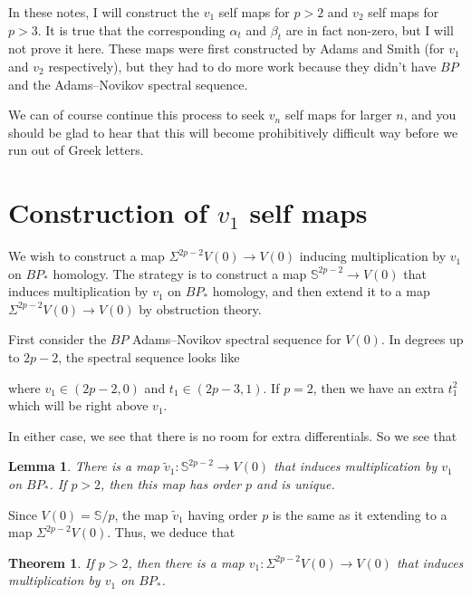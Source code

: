 \documentclass{shortart}
\newtheorem*{thm}{Theorem}
\newtheorem*{lemma}{Lemma}
\theoremstyle{definition}
\newcommand\Sph{\mathbb{S}}
\begin{document}
In these notes, I will construct the $v_1$ self maps for $p > 2$ and $v_2$ self maps for $p > 3$. It is true that the corresponding $\alpha_t$ and $\beta_t$ are in fact non-zero, but I will not prove it here. These maps were first constructed by Adams and Smith (for $v_1$ and $v_2$ respectively), but they had to do more work because they didn't have $BP$ and the Adams--Novikov spectral sequence.

We can of course continue this process to seek $v_n$ self maps for larger $n$, and you should be glad to hear that this will become prohibitively difficult way before we run out of Greek letters.
\section{Construction of \texorpdfstring{$v_1$}{v1} self maps}
We wish to construct a map $\Sigma^{2p - 2} V(0) \to V(0)$ inducing multiplication by $v_1$ on $BP_*$ homology. The strategy is to construct a map $\Sph^{2p - 2} \to V(0)$ that induces multiplication by $v_1$ on $BP_*$ homology, and then extend it to a map $\Sigma^{2p - 2}V(0) \to V(0)$ by obstruction theory.

First consider the $BP$ Adams--Novikov spectral sequence for $V(0)$. In degrees up to $2p - 2$, the spectral sequence looks like
\begin{center}
\end{center}
where $v_1 \in (2p - 2, 0)$ and $t_1 \in (2p - 3, 1)$. If $p = 2$, then we have an extra $t_1^2$ which will be right above $v_1$.

In either case, we see that there is no room for extra differentials. So we see that
\begin{lemma}
  There is a map $\tilde{v}_1: \Sph^{2p - 2} \to V(0)$ that induces multiplication by $v_1$ on $BP_*$. If $p > 2$, then this map has order $p$ and is unique.\fakeqed
\end{lemma}
Since $V(0) = \Sph/p$, the map $\tilde{v}_1$ having order $p$ is the same as it extending to a map $\Sigma^{2p - 2} V(0)$. Thus, we deduce that
\begin{thm}
  If $p > 2$, then there is a map $v_1: \Sigma^{2p - 2} V(0) \to V(0)$ that induces multiplication by $v_1$ on $BP_*$.
\end{thm}
\end{document}
